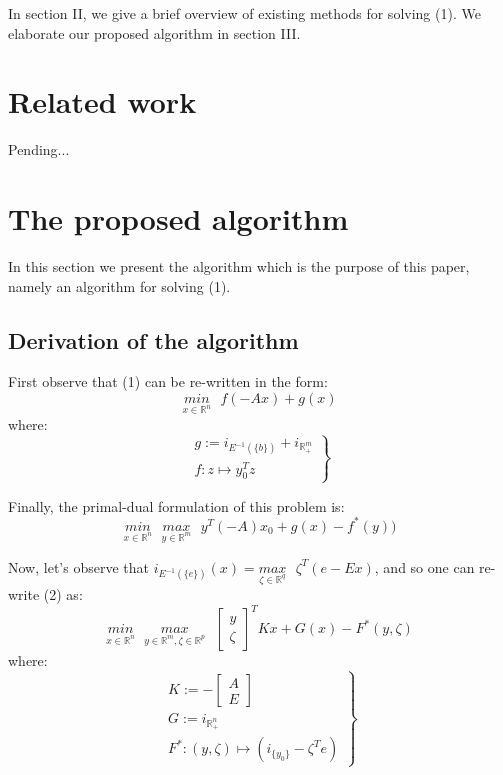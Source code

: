 \documentclass[a4paper,10pt,journal]{IEEEtran}
\begin{document}
In section II, we give a brief overview of existing methods for solving (1). We elaborate our proposed algorithm in section III.

\section{Related work}
Pending...

\section{The proposed algorithm}
In this section we present the algorithm which is the purpose of this paper, namely an algorithm for solving (1).

\subsection{Derivation of the algorithm}
First observe that (1) can be re-written in the form:
\begin{equation}
  \underset{x \in \mathbb{R}^n}{min}\text{ }{f(-Ax) + g(x)}
\end{equation}
where:\\
\begin{equation}
  \left.
  \begin{aligned}
    g := i_{E^{-1}(\{b\})} + i_{\mathbb{R}_{+}^m}\\
    f: z \mapsto y_0^Tz
    \end{aligned}
  \right\}
\end{equation}

Finally, the primal-dual formulation of this problem is:
\begin{equation}
  \underset{x \in \mathbb{R}^n}{min}\text{ }\underset{y \in \mathbb{R}^m}{max}\text{ }{y^T(-A)x_0 + g(x) - f^*(y))}
\end{equation}

Now, let's observe that $i_{E^{-1}(\{e\})}(x) = \underset{\zeta \in \mathbb{R}^q}{max}\text{ }\zeta^T(e - Ex)$, and so one can re-write (2) as:
\begin{equation}
  \underset{x \in \mathbb{R}^n}{min}\text{ }\underset{y \in \mathbb{R}^m, \zeta \in \mathbb{R}^p}{max}\text{ }
  \begin{bmatrix}y\\\zeta\end{bmatrix}^TKx + G(x) - F^*(y, \zeta)
\end{equation}
where:
\begin{equation}
  \left.
  \begin{aligned}
    K := -\begin{bmatrix}A\\E\end{bmatrix}\\
    G := i_{\mathbb{R}_{+}^n}\\
    F^*: (y, \zeta) \mapsto (i_{\{y_0\}} - \zeta^Te)
  \end{aligned}
  \right\}
\end{equation}
\end{document}
